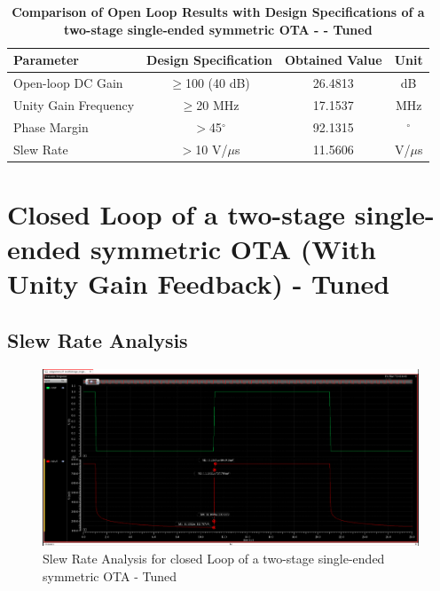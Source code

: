 \begin{table}[h]
    \centering
    \captionsetup{justification=centering} %
    \caption*{\textbf{Comparison of Open Loop Results with Design Specifications of a two-stage single-ended symmetric OTA - - Tuned }} %
    \begin{tabular}{l c c c}
        \toprule
        \textbf{Parameter} & \textbf{Design Specification} & \textbf{Obtained Value} & \textbf{Unit} \\
        \midrule
        Open-loop DC Gain & $\geq$100 (40 dB) & 26.4813 & dB \\
        Unity Gain Frequency & $\geq$20 MHz & 17.1537 & MHz \\
        Phase Margin & $>$45$^\circ$ & 92.1315 & $^\circ$ \\
        Slew Rate & $>$10 V/$\mu$s & 11.5606 & V/$\mu$s \\
        \bottomrule
    \end{tabular}
\end{table}

\newpage
\section{Closed Loop of a two-stage single-ended symmetric OTA  (With Unity Gain Feedback) - Tuned }
   

\subsection{Slew Rate Analysis}
    \begin{figure}[h]
        \centering
           \includegraphics[width=1\textwidth]{images/fine_tuned_close_slew.png}
        \caption{Slew Rate Analysis for closed Loop of a two-stage single-ended symmetric OTA - Tuned  }
        \label{fig: }
    \end{figure}

